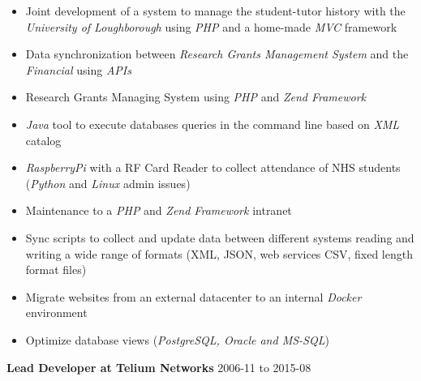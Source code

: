 \documentclass[margin]{res}
\begin{document}
\begin{itemize}
  \begin{itemize}
  \item
    Joint development of a system to manage the student-tutor history
    with the \emph{University of Loughborough} using \emph{PHP} and a
    home-made \emph{MVC} framework
  \item
    Data synchronization between \emph{Research Grants Management
    System} and the \emph{Financial} using \emph{APIs}
  \item
    Research Grants Managing System using \emph{PHP} and \emph{Zend
    Framework}
  \item
    \emph{Java} tool to execute databases queries in the command line
    based on \emph{XML} catalog
  \item
    \emph{RaspberryPi} with a RF Card Reader to collect attendance of
    NHS students (\emph{Python}
    and \emph{Linux} admin issues)
  \item
    Maintenance to a \emph{PHP} and \emph{Zend Framework} intranet
  \item
    Sync scripts to collect and update data between different systems
    reading and writing a wide range of formats (XML, JSON, web services
    CSV, fixed length format files)
  \item
    Migrate websites from an external datacenter to an internal
    \emph{Docker} environment
  \item
    Optimize database views (\emph{PostgreSQL, Oracle and MS-SQL})
  \end{itemize}
\end{itemize}

\begin{tabbing}
\textbf{Lead Developer at Telium Networks} 2006-11 to 2015-08
\end{tabbing}
\end{document}
